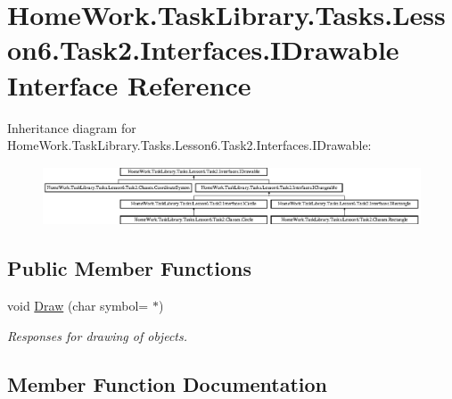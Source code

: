 \hypertarget{interface_home_work_1_1_task_library_1_1_tasks_1_1_lesson6_1_1_task2_1_1_interfaces_1_1_i_drawable}{}\section{Home\+Work.\+Task\+Library.\+Tasks.\+Lesson6.\+Task2.\+Interfaces.\+I\+Drawable Interface Reference}
\label{interface_home_work_1_1_task_library_1_1_tasks_1_1_lesson6_1_1_task2_1_1_interfaces_1_1_i_drawable}
Inheritance diagram for Home\+Work.\+Task\+Library.\+Tasks.\+Lesson6.\+Task2.\+Interfaces.\+I\+Drawable\+:\begin{figure}[H]
\begin{center}
\leavevmode
\includegraphics[height=1.736434cm]{interface_home_work_1_1_task_library_1_1_tasks_1_1_lesson6_1_1_task2_1_1_interfaces_1_1_i_drawable}
\end{center}
\end{figure}
\subsection*{Public Member Functions}
\begin{DoxyCompactItemize}
\item 
void \mbox{\hyperlink{interface_home_work_1_1_task_library_1_1_tasks_1_1_lesson6_1_1_task2_1_1_interfaces_1_1_i_drawable_abf1b3858b298548d8562a5e2229ac564}{Draw}} (char symbol=\textquotesingle{} $\ast$\textquotesingle{})
\begin{DoxyCompactList}\small\item\em Responses for drawing of objects. \end{DoxyCompactList}\end{DoxyCompactItemize}


\subsection{Member Function Documentation}
\mbox{\label{interface_home_work_1_1_task_library_1_1_tasks_1_1_lesson6_1_1_task2_1_1_interfaces_1_1_i_drawable_abf1b3858b298548d8562a5e2229ac564}} 
